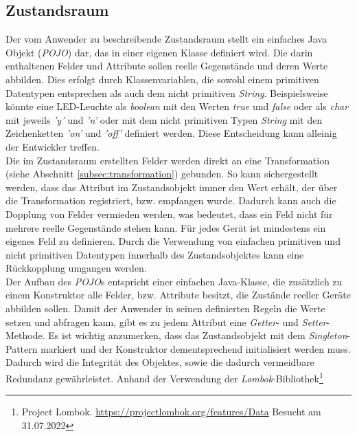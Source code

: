 \subsection{Zustandsraum}
\label{subsec:zustandsraum}
    Der vom Anwender zu beschreibende Zustandsraum stellt ein einfaches Java Objekt (\textit{\acs{POJO}}) dar, das in einer eigenen Klasse definiert wird. 
    Die darin enthaltenen Felder und Attribute sollen reelle Gegenstände und deren Werte abbilden. Dies erfolgt durch 
    Klassenvariablen, die sowohl einem primitiven Datentypen entsprechen als auch dem nicht primitiven \textit{String}. Beispielsweise könnte eine LED-Leuchte als \textit{boolean} mit den 
    Werten \textit{true} und \textit{false} oder als \textit{char} mit jeweils \textit{'y'} und \textit{'n'} oder mit dem nicht primitiven 
    Typen \textit{String} mit den Zeichenketten \textit{'on'} und \textit{'off'} definiert 
    werden. Diese Entscheidung kann alleinig der Entwickler treffen. 
    \\
    \linebreak
    Die im Zustandsraum erstellten Felder werden direkt an eine Transformation (siehe Abschnitt \ref{subsec:transformation}) gebunden. So kann sichergestellt werden, dass 
    das Attribut im Zustandsobjekt immer den Wert erhält, der über die Transformation registriert, bzw. empfangen wurde. Dadurch kann 
    auch die Dopplung von Felder vermieden werden, was bedeutet, dass ein Feld nicht für mehrere reelle Gegenstände stehen kann. Für jedes 
    Gerät ist mindestens ein eigenes Feld zu definieren. Durch die Verwendung von einfachen primitiven und nicht primitiven Datentypen innerhalb 
    des Zustandsobjektes kann eine Rückkopplung umgangen werden. 
    \\
    \linebreak
    Der Aufbau des \textit{\acs{POJO}}s entspricht einer einfachen Java-Klasse, die zusätzlich zu einem Konstruktor alle Felder, bzw. Attribute besitzt, die Zustände reeller 
    Geräte abbilden sollen. Damit der Anwender in seinen definierten Regeln die Werte setzen und abfragen kann, gibt es zu jedem Attribut eine \textit{Getter}- und \textit{Setter}-Methode.
    Es ist wichtig anzumerken, dass das Zustandsobjekt mit dem \textit{Singleton}-Pattern markiert und der Konstruktor dementsprechend initialisiert werden muss. Dadurch wird 
    die Integrität des Objektes, sowie die dadurch vermeidbare Redundanz gewährleistet. Anhand der Verwendung der \textit{Lombok}-Bibliothek\footnote{Project Lombok. \url{https://projectlombok.org/features/Data} Besucht am 31.07.2022} 
